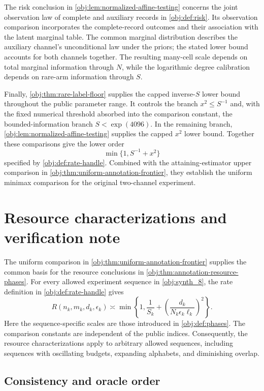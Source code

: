\documentclass[11pt]{article}
\begin{document}
The risk conclusion in \cref{obj:lem:normalized-affine-testing} concerns the joint observation law of complete and auxiliary records in \cref{obj:def:risk}. Its observation comparison incorporates the complete-record outcomes and their association with the latent marginal table. The common marginal distribution describes the auxiliary channel's unconditional law under the priors; the stated lower bound accounts for both channels together. The resulting many-cell scale depends on total marginal information through \(N\), while the logarithmic degree calibration depends on rare-arm information through \(S\).

Finally, \cref{obj:thm:rare-label-floor} supplies the capped inverse-\(S\) lower bound throughout the public parameter range. It controls the branch \(x^2\le S^{-1}\) and, with the fixed numerical threshold absorbed into the comparison constant, the bounded-information branch \(S<\exp(4096)\). In the remaining branch, \cref{obj:lem:normalized-affine-testing} supplies the capped \(x^2\) lower bound. Together these comparisons give the lower order
\[
\min\{1,S^{-1}+x^2\}
\]
specified by \cref{obj:def:rate-handle}. Combined with the attaining-estimator upper comparison in \cref{obj:thm:uniform-annotation-frontier}, they establish the uniform minimax comparison for the original two-channel experiment.


\section{Resource characterizations and verification note}

The uniform comparison in \cref{obj:thm:uniform-annotation-frontier} supplies the common basis for the resource conclusions in \cref{obj:thm:annotation-resource-phases}. For every allowed experiment sequence in \cref{obj:synth_8}, the rate definition in \cref{obj:def:rate-handle} gives
\[
R(n_k,m_k,d_k,\epsilon_k)
\asymp
\min\left\{
1,\frac{1}{S_k}
+\left(\frac{d_k}{N_k\epsilon_k\ell_k}\right)^2
\right\}.
\]
Here the sequence-specific scales are those introduced in \cref{obj:def:phases}. The comparison constants are independent of the public indices. Consequently, the resource characterizations apply to arbitrary allowed sequences, including sequences with oscillating budgets, expanding alphabets, and diminishing overlap.

\subsection{Consistency and oracle order}
\end{document}
